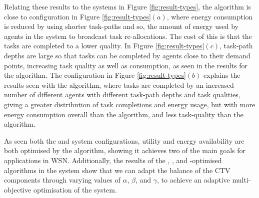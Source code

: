 Relating these results to the systems in Figure \ref{fig:result-types}, the \algorithmEnergy{}{} algorithm is close to configuration in Figure \ref{fig:result-types}$(a)$, where energy consumption is reduced by using shorter task-paths and so, the amount of energy used by agents in the system to broadcast task re-allocations. The cost of this is that the tasks are completed to a lower quality. In Figure \ref{fig:result-types}$(c)$, task-path depths are large so that tasks can be completed by agents close to their demand points, increasing task quality as well as consumption, as seen in the results for the \algorithmQuality{}{} algorithm. The configuration in Figure \ref{fig:result-types}$(b)$ explains the results seen with the \algorithmDistribution{}{} algorithm, where tasks are completed by an increased number of different agents with different task-path depths and task qualities, giving a greater distribution of task completions and energy usage, but with more energy consumption overall than the \algorithmEnergy{}{} algorithm, and less task-quality than the \algorithmQuality{}{} algorithm.

As seen both the \simulationSimple{}{} and \simulationExtended{}{} system configurations, utility and energy availability are both optimised by the algorithm, showing it achieves two of the main goals for applications in WSN. Additionally, the results of the \algorithmEnergy{}{}, \algorithmQuality{}{}, and \algorithmDistribution{}{}-optimised algorithms in the \simulationExtended{}{} system show that we can adapt the balance of the CTV components through varying values of $\alpha$, $\beta$, and $\gamma$, to achieve an adaptive multi-objective optimisation of the system.
